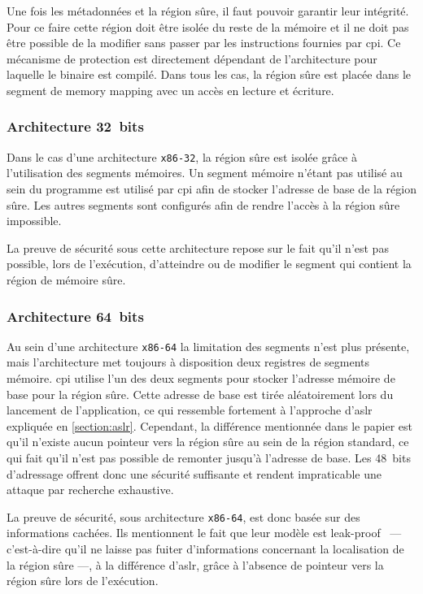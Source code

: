 Une fois les métadonnées et la région sûre, il faut pouvoir garantir leur intégrité. Pour ce faire cette région doit être isolée du reste de la mémoire et il ne doit pas être possible de la modifier sans passer par les instructions fournies par \gls{cpi}. Ce mécanisme de protection est directement dépendant de l'architecture pour laquelle le binaire est compilé. Dans tous les cas, la région sûre est placée dans le segment de \og memory mapping \fg avec un accès en lecture et écriture.

\subsubsection{Architecture 32~bits}

Dans le cas d'une architecture \texttt{x86-32}, la région sûre est isolée grâce à l'utilisation des segments mémoires. Un segment mémoire n'étant pas utilisé au sein du programme est utilisé par \gls{cpi} afin de stocker l'adresse de base de la région sûre. Les autres segments sont configurés afin de rendre l'accès à la région sûre impossible.

La preuve de sécurité sous cette architecture repose sur le fait qu'il n'est pas possible, lors de l'exécution, d'atteindre ou de modifier le segment qui contient la région de mémoire sûre.

\subsubsection{Architecture 64~bits}

Au sein d'une architecture \texttt{x86-64} la limitation des segments n'est plus présente, mais l'architecture met toujours à disposition deux registres de segments mémoire. \gls{cpi} utilise l'un des deux segments pour stocker l'adresse mémoire de base pour la région sûre. Cette adresse de base est tirée aléatoirement lors du lancement de l'application, ce qui ressemble fortement à l'approche d'\gls{aslr} expliquée en \autoref{section:aslr}. Cependant, la différence mentionnée dans le papier est qu'il n'existe aucun pointeur vers la région sûre au sein de la région standard, ce qui fait qu'il n'est pas possible de remonter jusqu'à l'adresse de base. Les 48~bits d'adressage offrent donc une sécurité suffisante et rendent impraticable une attaque par recherche exhaustive.

La preuve de sécurité, sous architecture \texttt{x86-64}, est donc basée sur des informations cachées. Ils mentionnent le fait que leur modèle est \og leak-proof \fg \ --- c’est-à-dire qu'il ne laisse pas fuiter d'informations concernant la localisation de la région sûre ---, à la différence d'\gls{aslr}, grâce à l'absence de pointeur vers la région sûre lors de l'exécution.


